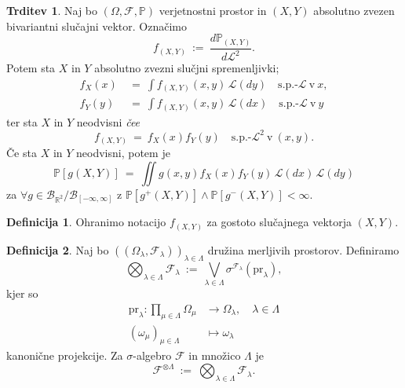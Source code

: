 \documentclass[11pt]{article}
\newcommand{\R}{\mathbb{R}}
\renewcommand{\P}{\mathbb{P}}
\newcommand{\F}{\mathcal{F}}
\newcommand{\B}{\mathscr{B}}
\newcommand{\LL}{\mathscr{L}}
\newcommand{\oklepaj}[1]{\left(#1\right)}
\newcommand{\1}{\mathbbm{1}}
\newcommand{\rr}{[-\infty,\infty]}
\newcommand{\pr}{\text{pr}}
\theoremstyle{definition}
\newtheorem{definicija}{Definicija}[section]
\theoremstyle{definition}
\newtheorem{trditev}{Trditev}[section]
\theoremstyle{definition}
\theoremstyle{definition}
\begin{document}
\begin{trditev}

Naj bo $(\Omega, \F, \P)$ verjetnostni prostor in $(X,Y)$ absolutno zvezen bivariantni slučajni vektor. Označimo
$$f_{(X,Y)} ~:=~ \frac{d\P_{(X,Y)}}{d\LL^2}.$$
Potem sta $X$ in $Y$ absolutno zvezni slučjni spremenljivki;
\begin{align*}
f_X(x) ~&=~ \int f_{(X,Y)}(x,y)\,\LL(dy) \quad \text{s.p.-}\LL ~\text{v}~x, \\
f_Y(y) ~&=~ \int f_{(X,Y)}(x,y)\,\LL(dx) \quad \text{s.p.-}\LL ~\text{v}~y
\end{align*}
ter sta $X$ in $Y$ neodvisni \textit{čee}
$$f_{(X,Y)} ~=~ f_X(x)f_Y(y) \quad \text{s.p.-}\LL^2 ~\text{v}~ (x,y).$$
Če sta $X$ in $Y$ neodvisni, potem je
$$\P[g(X,Y)] ~=~ \iint g(x,y) f_X(x) f_Y(y) \,\LL(dx)\,\LL(dy)$$
za $\forall g \in \B_{\R^2}/\B_{\rr}$ z $\P[g^+(X,Y)] \wedge \P[g^-(X,Y)] < \infty$.

\end{trditev}
\vspace{0.5cm}

\begin{definicija}

Ohranimo notacijo $f_{(X,Y)}$ za gostoto slučajnega vektorja $(X,Y)$.

\end{definicija}
\vspace{0.5cm}

\begin{definicija}

Naj bo $\oklepaj{(\Omega_\lambda, \F_\lambda)}_{\lambda\in\Lambda}$ družina merljivih prostorov. Definiramo
$$\bigotimes_{\lambda\in\Lambda} \F_\lambda ~:=~ \bigvee_{\lambda \in \Lambda} \sigma^{\F_\lambda}(\pr_\lambda),$$
kjer so 
\begin{align*}
\pr_\lambda: \prod_{\mu \in \Lambda} \Omega_\mu &\rightarrow \Omega_\lambda, \quad \lambda \in \Lambda \\
(\omega_\mu)_{\mu \in \Lambda} &\mapsto \omega_\lambda
\end{align*}
kanonične projekcije. Za $\sigma$-algebro $\F$ in množico $\Lambda$ je 
$$\F^{\otimes\Lambda} ~:=~ \bigotimes_{\lambda\in\Lambda} \F_\lambda.$$

\end{definicija}
\vspace{0.5cm}
\end{document}
